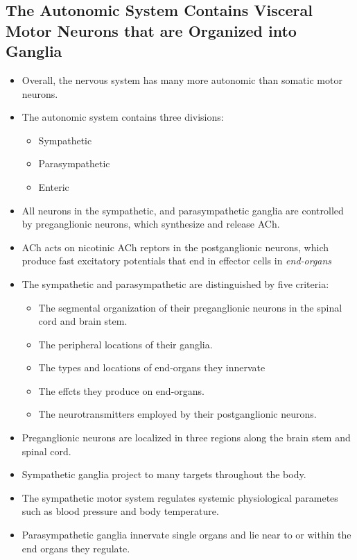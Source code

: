 \documentclass[12pt,a4paper]{article}
\begin{document}
\subsection{The Autonomic System Contains Visceral Motor Neurons that are Organized into Ganglia}
\begin{itemize}
    \item Overall, the nervous system has many more autonomic than somatic motor neurons.
    \item The autonomic system contains three divisions:
        \begin{itemize}
            \item Sympathetic
            \item Parasympathetic
            \item Enteric
        \end{itemize}
    \item All neurons in the sympathetic, and parasympathetic ganglia are controlled by preganglionic neurons, which synthesize and release ACh.
    \item ACh acts on nicotinic ACh  reptors in the postganglionic neurons, which produce fast excitatory potentials that end in effector cells in \textit{end-organs}
    \item The sympathetic and parasympathetic are distinguished by five criteria:
        \begin{itemize}
            \item The segmental organization of their preganglionic neurons in the spinal cord and brain stem.
            \item The peripheral locations of their ganglia.
            \item The types and locations of end-organs they innervate
            \item The effcts they produce on end-organs.
            \item The neurotransmitters employed by their postganglionic neurons.
        \end{itemize}
    \item Preganglionic neurons are localized in three regions along the brain stem and spinal cord.
    \item Sympathetic ganglia project to many targets throughout the body.
    \item The sympathetic motor system regulates systemic physiological parametes such as blood pressure and body temperature.
    \item Parasympathetic ganglia innervate single organs and lie near to or within the end organs they regulate.

\end{itemize}
\end{document}
